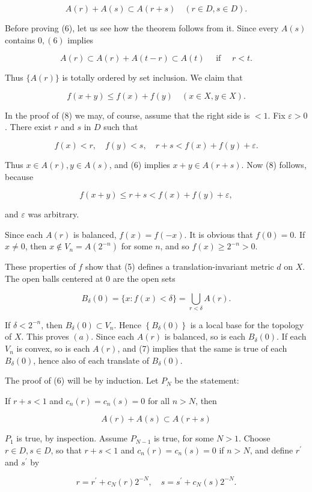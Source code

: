 \documentclass[10pt]{article}
\begin{document}
$$
A(r)+A(s) \subset A(r+s) \quad(r \in D, s \in D) .
$$

Before proving (6), let us see how the theorem follows from it. Since every $A(s)$ contains $0,(6)$ implies

$$
A(r) \subset A(r)+A(t-r) \subset A(t) \quad \text { if } \quad r<t .
$$

Thus $\{A(r)\}$ is totally ordered by set inclusion. We claim that

$$
f(x+y) \leq f(x)+f(y) \quad(x \in X, y \in X) .
$$

In the proof of (8) we may, of course, assume that the right side is $<1$. Fix $\varepsilon>0$. There exist $r$ and $s$ in $D$ such that

$$
f(x)<r, \quad f(y)<s, \quad r+s<f(x)+f(y)+\varepsilon .
$$

Thus $x \in A(r), y \in A(s)$, and (6) implies $x+y \in A(r+s)$. Now (8) follows, because

$$
f(x+y) \leq r+s<f(x)+f(y)+\varepsilon,
$$

and $\varepsilon$ was arbitrary.

Since each $A(r)$ is balanced, $f(x)=f(-x)$. It is obvious that $f(0)=0$. If $x \neq 0$, then $x \notin V_{n}=A\left(2^{-n}\right)$ for some $n$, and so $f(x) \geq 2^{-n}>0$.

These properties of $f$ show that (5) defines a translation-invariant metric $d$ on $X$. The open balls centered at 0 are the open sets

$$
B_{\delta}(0)=\{x: f(x)<\delta\}=\bigcup_{r<\delta} A(r) .
$$

If $\delta<2^{-n}$, then $B_{\delta}(0) \subset V_{n}$. Hence $\left\{B_{\delta}(0)\right\}$ is a local base for the topology of $X$. This proves $(a)$. Since each $A(r)$ is balanced, so is each $B_{\delta}(0)$. If each $V_{n}$ is convex, so is each $A(r)$, and (7) implies that the same is true of each $B_{\delta}(0)$, hence also of each translate of $B_{\delta}(0)$.

The proof of (6) will be by induction. Let $P_{N}$ be the statement:

If $r+s<1$ and $c_{n}(r)=c_{n}(s)=0$ for all $n>N$, then

$$
A(r)+A(s) \subset A(r+s)
$$

$P_{1}$ is true, by inspection. Assume $P_{N-1}$ is true, for some $N>1$. Choose $r \in D, s \in D$, so that $r+s<1$ and $c_{n}(r)=c_{n}(s)=0$ if $n>N$, and define $r^{\prime}$ and $s^{\prime}$ by

$$
r=r^{\prime}+c_{N}(r) 2^{-N}, \quad s=s^{\prime}+c_{N}(s) 2^{-N} .
$$
\end{document}
